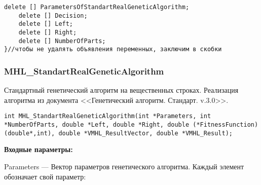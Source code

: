 \documentclass[a4paper,12pt]{article}
\begin{document}
\begin{lstlisting}[label=code_use_MHL_StandartGeneticAlgorithm,caption=Пример использования]
    delete [] ParametersOfStandartRealGeneticAlgorithm;
    delete [] Decision;
    delete [] Left;
    delete [] Right;
    delete [] NumberOfParts;
}//чтобы не удалять объявления переменных, заключим в скобки
\end{lstlisting}

\subsubsection{MHL\_StandartRealGeneticAlgorithm}\label{MHL_StandartRealGeneticAlgorithm}

Стандартный генетический алгоритм на вещественных строках. Реализация алгоритма из документа <<Генетический алгоритм. Стандарт. v.3.0>>.


\begin{lstlisting}[label=code_syntax_MHL_StandartRealGeneticAlgorithm,caption=Синтаксис]
int MHL_StandartRealGeneticAlgorithm(int *Parameters, int *NumberOfParts, double *Left, double *Right, double (*FitnessFunction)(double*,int), double *VMHL_ResultVector, double *VMHL_Result);
\end{lstlisting}

\textbf{Входные параметры:}
 
Parameters --- Вектор параметров генетического алгоритма. Каждый элемент обозначает свой параметр:
 
\end{document}
